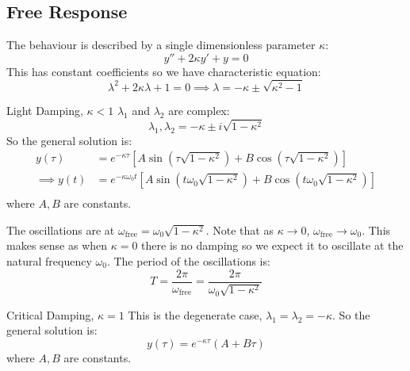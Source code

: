 \documentclass[../main.tex]{subfiles}
\begin{document}
\subsection{Free Response}
The behaviour is described by a single dimensionless parameter $\kappa$:
\[
  y'' + 2\kappa y' + y = 0
\]
This has constant coefficients so we have characteristic equation:
\[
  \lambda^2 + 2\kappa\lambda + 1 = 0 \implies \lambda = -\kappa \pm \sqrt{\kappa^2 - 1}
\]
\begin{proofcases}
  \begin{case}{Light Damping, $\kappa < 1$}
    $\lambda_1$ and $\lambda_2$ are complex:
    \[
      \lambda_1, \lambda_2 = -\kappa \pm i \sqrt{1 - \kappa^2}
    \]
    So the general solution is:
    \begin{align*}
      y(\tau) &= e^{-\kappa \tau}\left[A\sin\left(\tau\sqrt{1-\kappa^2}\right) + B\cos\left(\tau\sqrt{1 - \kappa^2}\right)\right] \\
      \implies y(t) &= e^{-\kappa \omega_0 t}\left[A\sin\left(t \omega_0\sqrt{1-\kappa^2}\right) + B\cos\left(t \omega_0\sqrt{1 - \kappa^2}\right)\right] \\
    \end{align*}
    where $A, B$ are constants.
    \begin{center}
    \end{center}
    The oscillations are at $\omega_{\text{free}} = \omega_0\sqrt{1 -\kappa^2}$.
    Note that as $\kappa \to 0$, $\omega_{\text{free}} \to \omega_0$.
    This makes sense as when $\kappa = 0$ there is no damping so we expect it to oscillate at the natural frequency $\omega_0$.
    The period of the oscillations is:
    \[
      T=\frac{2\pi}{\omega_{\text{free}}} = \frac{2\pi}{\omega_0\sqrt{1 - \kappa^2}}
    \]
  \end{case}
  \begin{case}{Critical Damping, $\kappa = 1$}
    This is the degenerate case, $\lambda_1 = \lambda_2 = -\kappa$.
    So the general solution is:
    \[
      y(\tau) = e^{-\kappa \tau}(A + B\tau)
    \]
    where $A, B$ are constants.
    \begin{center}
\end{center}
\end{case}
\end{proofcases}
\end{document}

